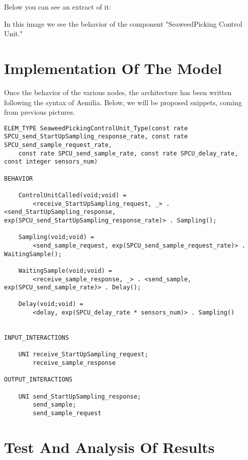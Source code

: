 Below you can see an extract of it:

\begin{center}
\end{center}
\bigskip
{}
\bigskip

In this image we see the behavior of the component "SeaweedPicking Control Unit." 

\section{Implementation Of The Model}

Once the behavior of the various nodes, the architecture has been written following the syntax of Aemilia. Below, we will be proposed snippets, coming from previous pictures. 

\lstset {language = C}
\bigskip
\begin{lstlisting}
ELEM_TYPE SeaweedPickingControlUnit_Type(const rate SPCU_send_StartUpSampling_response_rate, const rate SPCU_send_sample_request_rate, 
	const rate SPCU_send_sample_rate, const rate SPCU_delay_rate, const integer sensors_num)

BEHAVIOR

	ControlUnitCalled(void;void) = 
		<receive_StartUpSampling_request, _> . <send_StartUpSampling_response, exp(SPCU_send_StartUpSampling_response_rate)> . Sampling();

	Sampling(void;void) = 
		<send_sample_request, exp(SPCU_send_sample_request_rate)> . WaitingSample();

	WaitingSample(void;void) = 
		<receive_sample_response, _> . <send_sample, exp(SPCU_send_sample_rate)> . Delay();

	Delay(void;void) =
		<delay, exp(SPCU_delay_rate * sensors_num)> . Sampling()


INPUT_INTERACTIONS

	UNI receive_StartUpSampling_request;
		receive_sample_response

OUTPUT_INTERACTIONS 

	UNI send_StartUpSampling_response;
		send_sample;
		send_sample_request
\end{lstlisting}

\section{Test And Analysis Of Results}

